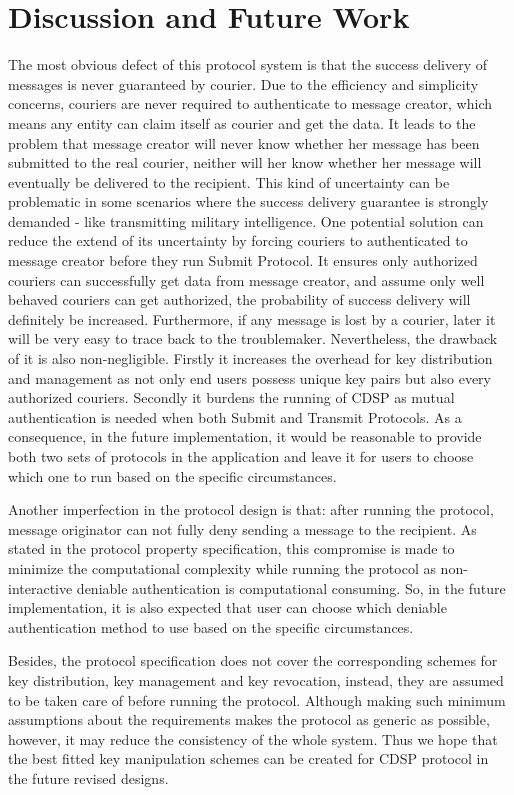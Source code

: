 \section{Discussion and Future Work}
The most obvious defect of this protocol system is that the success delivery of messages is never guaranteed by courier. Due to the efficiency and simplicity concerns, couriers are never required to authenticate to message creator, which means any entity can claim itself as courier and get the data. It leads to the problem that message creator will never know whether her message has been submitted to the real courier, neither will her know whether her message will eventually be delivered to the recipient. This kind of uncertainty can be problematic in some scenarios where the success delivery guarantee is strongly demanded - like transmitting military intelligence. One potential solution can reduce the extend of its uncertainty by forcing couriers to authenticated to message creator before they run Submit Protocol. It ensures only authorized couriers can successfully get data from message creator, and assume only well behaved couriers can get authorized, the probability of success delivery will definitely be increased. Furthermore, if any message is lost by a courier, later it will be very easy to trace back to the troublemaker. Nevertheless, the drawback of it is also non-negligible. Firstly it increases the overhead for key distribution and management as not only end users possess unique key pairs but also every authorized couriers. Secondly it burdens the running of CDSP as mutual authentication is needed when both Submit and Transmit Protocols. As a consequence, in the future implementation, it would be reasonable to provide both two sets of protocols in the application and leave it for users to choose which one to run based on the specific circumstances.

Another imperfection in the protocol design is that: after running the protocol, message originator can not fully deny sending a message to the recipient. As stated in the protocol property specification, this compromise is made to minimize the computational complexity while running the protocol as non-interactive deniable authentication is computational consuming. So, in the future implementation, it is also expected that user can choose which deniable authentication method to use based on the specific circumstances.

Besides, the protocol specification does not cover the corresponding schemes for key distribution, key management and key revocation, instead, they are assumed to be taken care of before running the protocol. Although making such minimum assumptions about the requirements makes the protocol as generic as possible, however, it may reduce the consistency of the whole system. Thus we hope that the best fitted key manipulation schemes can be created for CDSP protocol in the future revised designs.

